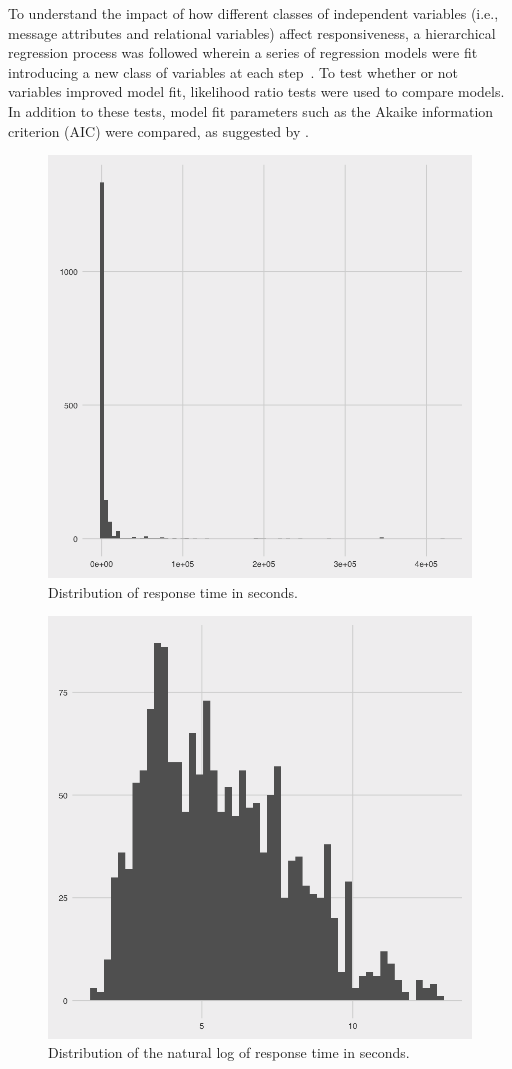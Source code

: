 \documentclass[12pt]{nuthesis}	%
\begin{document}
To understand the impact of how different classes of independent variables (i.e., message attributes and relational variables) affect responsiveness, a hierarchical regression process was followed wherein a series of regression models were fit introducing a new class of variables at each step~\citep{gurnsey2017statistics}. To test whether or not variables improved model fit, likelihood ratio tests were used to compare models. In addition to these tests, model fit parameters such as the Akaike information criterion (AIC) were compared, as suggested by \citet{gelman2007data}.

\begin{figure}[h]
\centering
\includegraphics[width=.7\textwidth]{figures/response_time_distribution}
\caption{Distribution of response time in seconds.}
\label{fig:response_time}
\end{figure}

\begin{figure}[h]
\centering
\includegraphics[width=.7\textwidth]{figures/log_response_time_distribution}
\caption{Distribution of the natural log of response time in seconds.}
\label{fig:log_response_time}
\end{figure}
\end{document}
